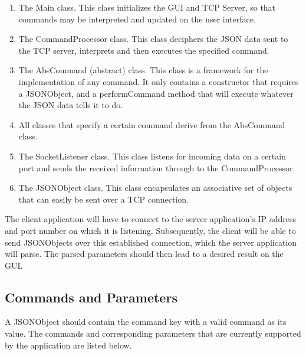 \documentclass[11pt,a4paper]{article}
\begin{document}
\begin{enumerate}
\item The Main class. This class initializes the GUI and TCP Server, so that commands may be interpreted and updated on the user interface.
\item The CommandProcessor class. This class deciphers the JSON data sent to the TCP server, interprets and then executes the specified command.
\item The AbsCommand (abstract) class. This class is a framework for the implementation of any command. It only contains a constructor that requires a JSONObject, and a performCommand method that will execute whatever the JSON data tells it to do.
\item All classes that specify a certain command derive from the AbsCommand class.
\item The SocketListener class. This class listens for incoming data on a certain port and sends the received information through to the CommandProcessor.
\item The JSONObject class. This class encapsulates an associative set of objects that can easily be sent over a TCP connection.
\end{enumerate}
The client application will have to connect to the server application's IP address and port number on which it is listening. Subsequently, the client will be able to send JSONObjects over this established connection, which the server application will parse. The parsed parameters should then lead to a desired result on the GUI.

\subsection{Commands and Parameters}

A JSONObject should contain the command key with a valid command as its value. The commands and corresponding parameters that are currently supported by the application are listed below.
\end{document}
